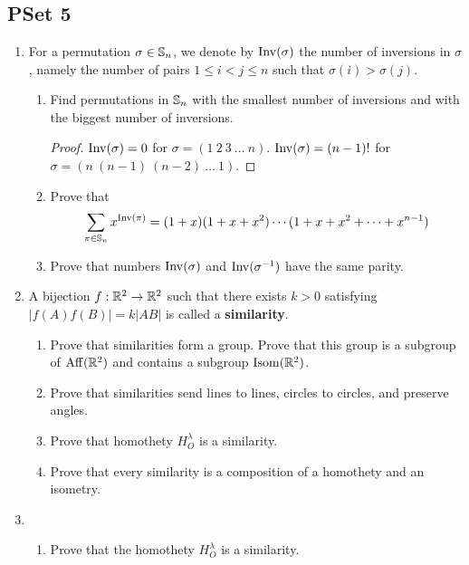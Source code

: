 \documentclass[../apprentice.tex]{subfiles}
\begin{document}
\chapter{}
\section{PSet 5}
\begin{enumerate}
    \item {}For a permutation $\sigma\in\mathbb{S}_n$, we denote by $\operatorname{Inv}(\sigma)$ the number of inversions in $\sigma$, namely the number of pairs $1\leq i<j\leq n$ such that $\sigma(i)>\sigma(j)$.
    \begin{enumerate}
        \item Find permutations in $\mathbb{S}_n$ with the smallest number of inversions and with the biggest number of inversions.
        \begin{proof}
            $\operatorname{Inv}(\sigma)=0$ for $\sigma=(1\ 2\ 3\ \dots\ n)$. $\operatorname{Inv}(\sigma)=(n-1)!$ for $\sigma=(n\ (n-1)\ (n-2)\ \dots\ 1)$.
        \end{proof}
        \item Prove that 
        \begin{equation*}
            \sum_{\pi\in\mathbb{S}_n}x^{\operatorname{Inv}(\pi)} = (1+x)(1+x+x^2)\cdots (1+x+x^2+\cdots+x^{n-1})
        \end{equation*}
        \item Prove that numbers $\operatorname{Inv}(\sigma)$ and $\operatorname{Inv}(\sigma^{-1})$ have the same parity.
    \end{enumerate}
    \item A bijection $f:\mathbb{R}^2\to\mathbb{R}^2$ such that there exists $k>0$ satisfying $|f(A)f(B)|=k|AB|$ is called a \textbf{similarity}.
    \begin{enumerate}
        \item Prove that similarities form a group. Prove that this group is a subgroup of $\operatorname{Aff}(\mathbb{R}^2)$ and contains a subgroup $\operatorname{Isom}(\mathbb{R}^2)$.
        \item Prove that similarities send lines to lines, circles to circles, and preserve angles.
        \item Prove that homothety $H_O^{\lambda}$ is a similarity. 
        \item Prove that every similarity is a composition of a homothety and an isometry.
    \end{enumerate}
    \item 
    \begin{enumerate}
        \item Prove that the homothety $H_O^{\lambda}$ is a similarity. 

\end{enumerate}
\end{enumerate}
\end{document}
